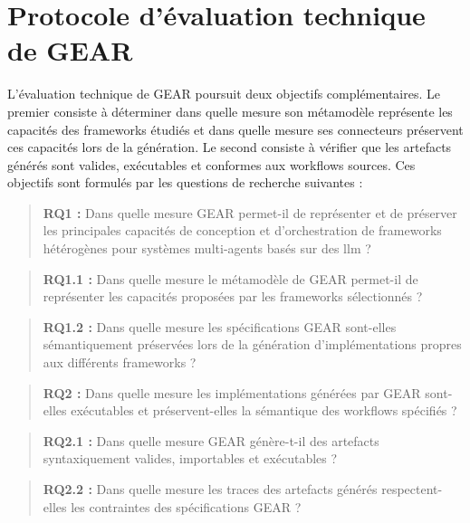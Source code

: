 
\section{Protocole d'évaluation technique de GEAR}
\label{sec:protocole-evaluation-technique}

L'évaluation technique de GEAR poursuit deux objectifs complémentaires.
Le premier consiste à déterminer dans quelle mesure son métamodèle représente
les capacités des frameworks étudiés et dans quelle mesure ses connecteurs
préservent ces capacités lors de la génération. Le second consiste à vérifier
que les artefacts générés sont valides, exécutables et conformes aux workflows
sources. Ces objectifs sont formulés par les questions de recherche suivantes :

\begin{quote}
\textbf{RQ1 :} Dans quelle mesure GEAR permet-il de représenter et de préserver
les principales capacités de conception et d'orchestration de frameworks
hétérogènes pour systèmes multi-agents basés sur des \gls{llm} ?
\end{quote}

\begin{quote}
\textbf{RQ1.1 :} Dans quelle mesure le métamodèle de GEAR permet-il de
représenter les capacités proposées par les frameworks sélectionnés ?
\end{quote}

\begin{quote}
\textbf{RQ1.2 :} Dans quelle mesure les spécifications GEAR sont-elles
sémantiquement préservées lors de la génération d'implémentations propres aux
différents frameworks ?
\end{quote}

\begin{quote}
\textbf{RQ2 :} Dans quelle mesure les implémentations générées par GEAR
sont-elles exécutables et préservent-elles la sémantique des workflows
spécifiés ?
\end{quote}

\begin{quote}
\textbf{RQ2.1 :} Dans quelle mesure GEAR génère-t-il des artefacts
syntaxiquement valides, importables et exécutables ?
\end{quote}

\begin{quote}
\textbf{RQ2.2 :} Dans quelle mesure les traces des artefacts générés
respectent-elles les contraintes des spécifications GEAR ?
\end{quote}

